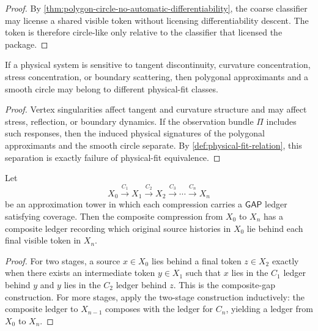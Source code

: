 \begin{proof}
By \autoref{thm:polygon-circle-no-automatic-differentiability}, the coarse classifier may license a shared visible token without licensing differentiability descent. The token is therefore circle-like only relative to the classifier that licensed the package.
\end{proof}

\begin{corollary}
\label{cor:hidden-vertices-physically-relevant}
If a physical system is sensitive to tangent discontinuity, curvature concentration, stress concentration, or boundary scattering, then polygonal approximants and a smooth circle may belong to different physical-fit classes.
\end{corollary}

\begin{proof}
Vertex singularities affect tangent and curvature structure and may affect stress, reflection, or boundary dynamics. If the observation bundle $\Pi$ includes such responses, then the induced physical signatures of the polygonal approximants and the smooth circle separate. By \autoref{def:physical-fit-relation}, this separation is exactly failure of physical-fit equivalence.
\end{proof}

\begin{theorem}
\label{thm:composite-towers-retain-source-dependence}
Let
$$
X_0\xrightarrow{C_1}X_1\xrightarrow{C_2}X_2\xrightarrow{C_3}\cdots\xrightarrow{C_n}X_n
$$
be an approximation tower in which each compression carries a $\mathsf{GAP}$ ledger satisfying coverage. Then the composite compression from $X_0$ to $X_n$ has a composite ledger recording which original source histories in $X_0$ lie behind each final visible token in $X_n$.
\end{theorem}

\begin{proof}
For two stages, a source $x\in X_0$ lies behind a final token $z\in X_2$ exactly when there exists an intermediate token $y\in X_1$ such that $x$ lies in the $C_1$ ledger behind $y$ and $y$ lies in the $C_2$ ledger behind $z$. This is the composite-gap construction. For more stages, apply the two-stage construction inductively: the composite ledger to $X_{n-1}$ composes with the ledger for $C_n$, yielding a ledger from $X_0$ to $X_n$.
\end{proof}

